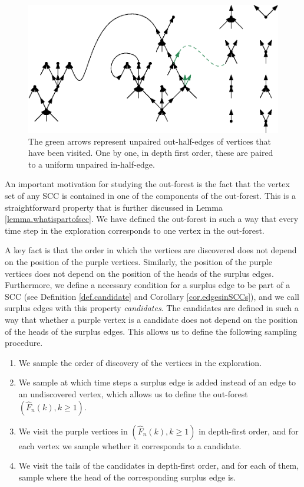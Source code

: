 \begin{figure}
    \centering
    \includegraphics[scale=0.6]{Content/Pictures/configuration_model.eps}
    \caption{The green arrows represent unpaired out-half-edges of vertices that have been visited. One by one, in depth first order, these are paired to a uniform unpaired in-half-edge.}
    \label{fig.configuration model}
\end{figure}

An important motivation for studying the out-forest is the fact that the vertex set of any SCC is contained in one of the components of the out-forest. This is a straightforward property that is further discussed in Lemma \ref{lemma.whatispartofscc}. We have defined the out-forest in such a way that every time step in the exploration corresponds to one vertex in the out-forest. 

A key fact is that the order in which the vertices are discovered does not depend on the position of the purple vertices. Similarly, the position of the purple vertices does not depend on the position of the heads of the surplus edges. Furthermore, we define a necessary condition for a surplus edge to be part of a SCC (see Definition \ref{def.candidate} and Corollary \ref{cor.edgesinSCCs}), and we call surplus edges with this property \emph{candidates}. The candidates are defined in such a way that whether a purple vertex is a candidate does not depend on the position of the heads of the surplus edges. This allows us to define the following sampling procedure.
\begin{enumerate}
    \item We sample the order of discovery of the vertices in the exploration.
    \item We sample at which time steps a surplus edge is added instead of an edge to an undiscovered vertex, which allows us to define the out-forest $(\hat{F}_n(k),k\geq 1)$. 
    \item We visit the purple vertices in $(\hat{F}_n(k),k\geq 1)$ in depth-first order, and for each vertex we sample whether it corresponds to a candidate.
    \item We visit the tails of the candidates in depth-first order, and for each of them, sample where the head of the corresponding surplus edge is.
\end{enumerate}

